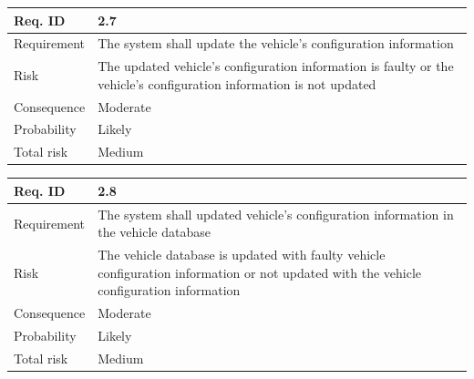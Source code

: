 
\begin{table}[H]
\centering
\begin{tabularx}{1.0\textwidth}{
    |p{}%
    |p{}|%
}
\hline

Req. ID
& 2.7
\\
\hline

Requirement
& The system shall update the vehicle's configuration information
\\
\hline

Risk
& 
The updated vehicle's configuration information is faulty or the vehicle's configuration information is not updated
\\
\hline

Consequence
&
Moderate
\\
\hline

Probability
&
Likely
\\
\hline

Total risk
&
Medium
\\
\hline

\end{tabularx}
\end{table}


\begin{table}[H]
\centering
\begin{tabularx}{1.0\textwidth}{
    |p{}%
    |p{}|%
}
\hline

Req. ID
& 2.8
\\
\hline

Requirement
& The system shall updated vehicle's configuration information in the vehicle database 
\\
\hline

Risk
& 
The vehicle database is updated with faulty vehicle configuration information or not updated with the vehicle configuration information
\\
\hline

Consequence
&
Moderate
\\
\hline

Probability
&
Likely
\\
\hline

Total risk
&
Medium
\\
\hline

\end{tabularx}
\end{table}

